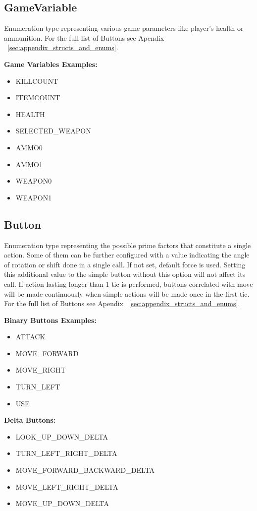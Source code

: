\documentclass[english,bachelor,a4paper,twoside]{ppfcmthesis}
\begin{document}
\subsection{GameVariable} \label{subsec:gamevar}
Enumeration type representing various game parameters like player's health or ammunition. For the full list of Buttons see Apendix ~\ref{sec:appendix_structs_and_enums}.


\vspace{30pt}
\textbf{Game Variables Examples:}
\begin{itemize}
	\item KILLCOUNT
	\item ITEMCOUNT
	\item HEALTH
	\item SELECTED\_WEAPON
	\item AMMO0
	\item AMMO1
	\item WEAPON0
	\item WEAPON1
\end{itemize}

\subsection{Button} \label{subsec:button}

	Enumeration type representing the possible prime factors that constitute a single action. Some of them can be further configured with a value indicating the angle of rotation or shift done in a single call. If not set, default force is used. Setting this additional value to the simple button without this option will not affect its call. If action lasting longer than 1 tic is performed, buttons correlated with move will be made continuously when simple actions will be made once in the first tic. For the full list of Buttons see Apendix ~\ref{sec:appendix_structs_and_enums}.


\vspace{20pt}
\textbf{Binary Buttons Examples:}
\begin{itemize} 
	\item ATTACK
	\item MOVE\_FORWARD
	\item MOVE\_RIGHT
	\item TURN\_LEFT
	\item USE
\end{itemize}

\vspace{20pt}
\textbf{Delta Buttons:}
\begin{itemize} 
	 \item LOOK\_UP\_DOWN\_DELTA
	 \item TURN\_LEFT\_RIGHT\_DELTA
	 \item MOVE\_FORWARD\_BACKWARD\_DELTA
	 \item MOVE\_LEFT\_RIGHT\_DELTA
	 \item MOVE\_UP\_DOWN\_DELTA
\end{itemize}
\end{document}
